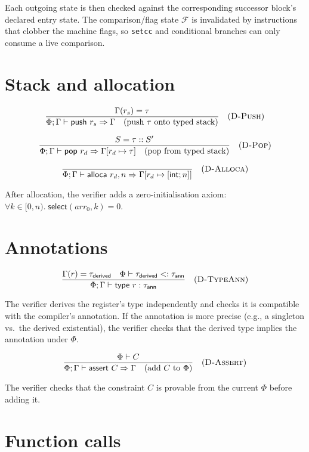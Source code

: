 \noindent Each outgoing state is then checked against the corresponding successor block's declared entry state. The comparison/flag state $\mathcal{F}$ is invalidated by instructions that clobber the machine flags, so \texttt{setcc} and conditional branches can only consume a live comparison.

\section*{Stack and allocation}

$$
  \frac{\Gamma(r_s) = \tau}{\Phi; \Gamma \vdash \textsf{push } r_s \Rightarrow \Gamma \quad \text{(push } \tau \text{ onto typed stack)}} \quad (\textsc{D-Push})
$$

$$
  \frac{S = \tau :: S'}{\Phi; \Gamma \vdash \textsf{pop } r_d \Rightarrow \Gamma[r_d \mapsto \tau] \quad \text{(pop from typed stack)}} \quad (\textsc{D-Pop})
$$

$$
  \frac{}{\Phi; \Gamma \vdash \textsf{alloca } r_d, n \Rightarrow \Gamma[r_d \mapsto [\textsf{int}; n]]} \quad (\textsc{D-Alloca})
$$

\noindent After allocation, the verifier adds a zero-initialisation axiom: $\forall k \in [0, n).\; \textsf{select}(\mathit{arr}_0, k) = 0$.

\section*{Annotations}

$$
  \frac{
    \Gamma(r) = \tau_\textsf{derived} \quad \Phi \vdash \tau_\textsf{derived} <: \tau_\textsf{ann}
  }{\Phi; \Gamma \vdash \textsf{type } r: \tau_\textsf{ann}} \quad (\textsc{D-TypeAnn})
$$

\noindent The verifier derives the register's type independently and checks it is compatible with the compiler's annotation. If the annotation is more precise (e.g., a singleton vs.\ the derived existential), the verifier checks that the derived type implies the annotation under $\Phi$.

$$
  \frac{
    \Phi \vdash C
  }{\Phi; \Gamma \vdash \textsf{assert } C \Rightarrow \Gamma \quad \text{(add } C \text{ to } \Phi\text{)}} \quad (\textsc{D-Assert})
$$

\noindent The verifier checks that the constraint $C$ is provable from the current $\Phi$ before adding it.

\section*{Function calls}

